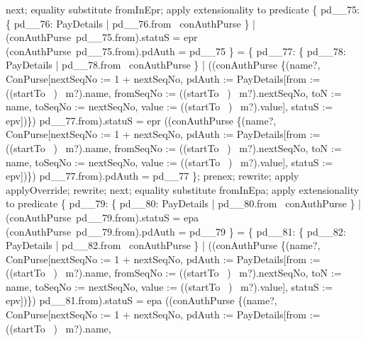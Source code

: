 \begin{LPScript}
\begin{zproof}[lPromotedAuxWorldStartToType]
    next;
        equality substitute fromInEpr;
        apply extensionality to predicate
            \{ pd\_\_75: \{ pd\_\_76: PayDetails | pd\_\_76.from \in \dom~conAuthPurse \}
                | (conAuthPurse~pd\_\_75.from).statuS = epr
                \land (conAuthPurse~pd\_\_75.from).pdAuth = pd\_\_75 \}
            = \{ pd\_\_77: \{ pd\_\_78: PayDetails | pd\_\_78.from \in \dom~conAuthPurse \}
                | ((conAuthPurse \oplus \{(name?, \theta ConPurse[nextSeqNo := 1 + nextSeqNo,
                pdAuth := \theta PayDetails[from := ((startTo~ \inv)~ m?).name,
                    fromSeqNo := ((startTo~ \inv)~ m?).nextSeqNo, 
                    toN := name, toSeqNo := nextSeqNo,
                    value := ((startTo~ \inv)~ m?).value],
                statuS := epv])\}) pd\_\_77.from).statuS = epr
             \land ((conAuthPurse \oplus \{(name?, \theta ConPurse[nextSeqNo := 1 + nextSeqNo,
                pdAuth := \theta PayDetails[from := ((startTo~ \inv)~ m?).name,
                    fromSeqNo := ((startTo~ \inv)~ m?).nextSeqNo, 
                    toN := name, toSeqNo := nextSeqNo,
                    value := ((startTo~ \inv)~ m?).value],
                statuS := epv])\}) pd\_\_77.from).pdAuth = pd\_\_77 \};
        prenex;
        rewrite;
        apply applyOverride;
        rewrite;
    next;
        equality substitute fromInEpa;
        apply extensionality to predicate
            \{ pd\_\_79: \{ pd\_\_80: PayDetails | pd\_\_80.from \in \dom~conAuthPurse \}
                | (conAuthPurse~pd\_\_79.from).statuS = epa
                \land (conAuthPurse~pd\_\_79.from).pdAuth = pd\_\_79 \}
            = \{ pd\_\_81: \{ pd\_\_82: PayDetails | pd\_\_82.from \in \dom~conAuthPurse \}
                | ((conAuthPurse \oplus \{(name?, \theta ConPurse[nextSeqNo := 1 + nextSeqNo,
                 pdAuth := \theta PayDetails[from := ((startTo~ \inv)~ m?).name,
                    fromSeqNo := ((startTo~ \inv)~ m?).nextSeqNo, 
                    toN := name, toSeqNo := nextSeqNo,
                    value := ((startTo~ \inv)~ m?).value],
                statuS := epv])\}) pd\_\_81.from).statuS = epa
                \land ((conAuthPurse \oplus \{(name?, \theta ConPurse[nextSeqNo := 1 + nextSeqNo,
                    pdAuth := \theta PayDetails[from := ((startTo~ \inv)~ m?).name,

\end{zproof}
\end{LPScript}
